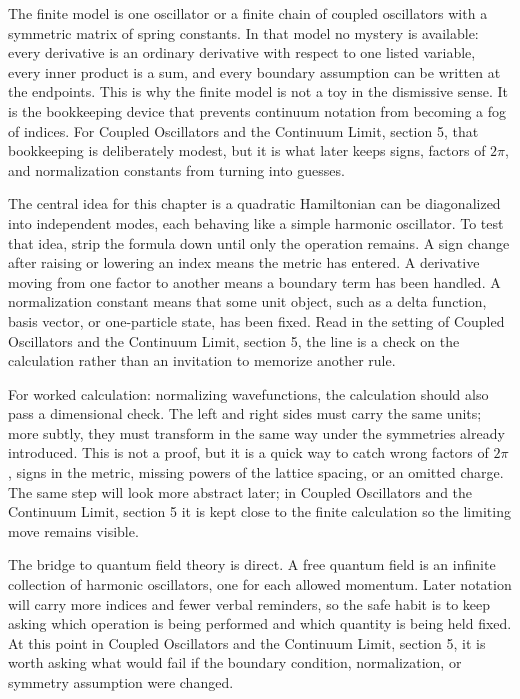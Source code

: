 The finite model is one oscillator or a finite chain of coupled oscillators with a symmetric matrix of spring constants.  In that model no mystery is available: every derivative is an ordinary derivative with respect to one listed variable, every inner product is a sum, and every boundary assumption can be written at the endpoints.  This is why the finite model is not a toy in the dismissive sense.  It is the bookkeeping device that prevents continuum notation from becoming a fog of indices.  For Coupled Oscillators and the Continuum Limit, section 5, that bookkeeping is deliberately modest, but it is what later keeps signs, factors of \(2\pi\), and normalization constants from turning into guesses.

The central idea for this chapter is a quadratic Hamiltonian can be diagonalized into independent modes, each behaving like a simple harmonic oscillator.  To test that idea, strip the formula down until only the operation remains.  A sign change after raising or lowering an index means the metric has entered.  A derivative moving from one factor to another means a boundary term has been handled.  A normalization constant means that some unit object, such as a delta function, basis vector, or one-particle state, has been fixed.  Read in the setting of Coupled Oscillators and the Continuum Limit, section 5, the line is a check on the calculation rather than an invitation to memorize another rule.

For worked calculation: normalizing wavefunctions, the calculation should also pass a dimensional check.  The left and right sides must carry the same units; more subtly, they must transform in the same way under the symmetries already introduced.  This is not a proof, but it is a quick way to catch wrong factors of \(2\pi\), signs in the metric, missing powers of the lattice spacing, or an omitted charge.  The same step will look more abstract later; in Coupled Oscillators and the Continuum Limit, section 5 it is kept close to the finite calculation so the limiting move remains visible.

The bridge to quantum field theory is direct.  A free quantum field is an infinite collection of harmonic oscillators, one for each allowed momentum.  Later notation will carry more indices and fewer verbal reminders, so the safe habit is to keep asking which operation is being performed and which quantity is being held fixed.  At this point in Coupled Oscillators and the Continuum Limit, section 5, it is worth asking what would fail if the boundary condition, normalization, or symmetry assumption were changed.


